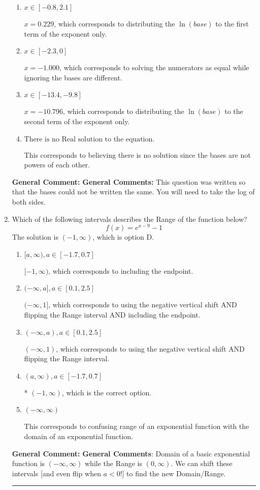 \documentclass{extbook}[14pt]
\newcommand{\litem}[1]{\item #1

\rule{\textwidth}{0.4pt}}
\begin{document}
\begin{enumerate}
{\begin{enumerate}[label=\Alph*.]
* $x = 2.477$, which is the correct option.
\item \( x \in [-0.8, 2.1] \)

$x = 0.229$, which corresponds to distributing the $\ln(base)$ to the first term of the exponent only.
\item \( x \in [-2.3, 0] \)

$x = -1.000$, which corresponds to solving the numerators as equal while ignoring the bases are different.
\item \( x \in [-13.4, -9.8] \)

$x = -10.796$, which corresponds to distributing the $\ln(base)$ to the second term of the exponent only.
\item \( \text{There is no Real solution to the equation.} \)

This corresponds to believing there is no solution since the bases are not powers of each other.
\end{enumerate}

\textbf{General Comment:} \textbf{General Comments:} This question was written so that the bases could not be written the same. You will need to take the log of both sides.
}
\litem{
Which of the following intervals describes the Range of the function below?
\[ f(x) = e^{x-9}-1 \]The solution is \( (-1, \infty) \), which is option D.\begin{enumerate}[label=\Alph*.]
\item \( [a, \infty), a \in [-1.7, 0.7] \)

$[-1, \infty)$, which corresponds to including the endpoint.
\item \( (-\infty, a], a \in [0.1, 2.5] \)

$(-\infty, 1]$, which corresponds to using the negative vertical shift AND flipping the Range interval AND including the endpoint.
\item \( (-\infty, a), a \in [0.1, 2.5] \)

$(-\infty, 1)$, which corresponds to using the negative vertical shift AND flipping the Range interval.
\item \( (a, \infty), a \in [-1.7, 0.7] \)

* $(-1, \infty)$, which is the correct option.
\item \( (-\infty, \infty) \)

This corresponds to confusing range of an exponential function with the domain of an exponential function.
\end{enumerate}

\textbf{General Comment:} \textbf{General Comments}: Domain of a basic exponential function is $(-\infty, \infty)$ while the Range is $(0, \infty)$. We can shift these intervals [and even flip when $a<0$!] to find the new Domain/Range.
}
\end{enumerate}
\end{document}
